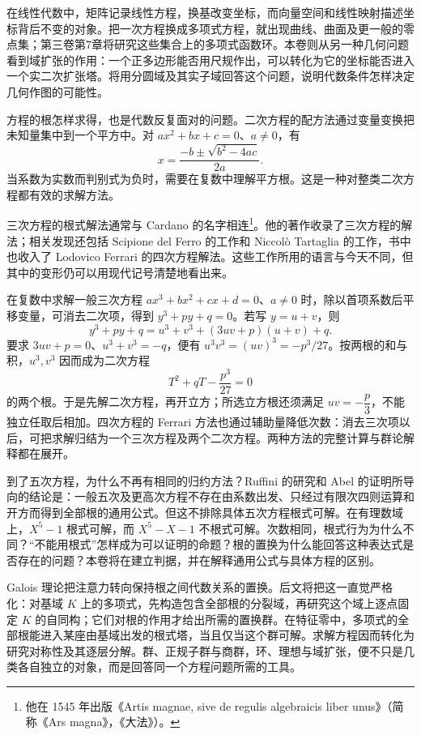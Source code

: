 在线性代数中，矩阵记录线性方程，换基改变坐标，而向量空间和线性映射描述坐标背后不变的对象。把一次方程换成多项式方程，就出现曲线、曲面及更一般的零点集；第三卷第7章将研究这些集合上的多项式函数环。本卷则从另一种几何问题看到域扩张的作用：一个正多边形能否用尺规作出，可以转化为它的坐标能否进入一个实二次扩张塔。将用分圆域及其实子域回答这个问题，说明代数条件怎样决定几何作图的可能性。

\ProseParagraphBreak
方程的根怎样求得，也是代数反复面对的问题。二次方程的配方法通过变量变换把未知量集中到一个平方中。对 \(ax^2+bx+c=0\)、\(a\ne0\)，有
\[
	x=\frac{-b\pm\sqrt{b^2-4ac}}{2a}.
\]
当系数为实数而判别式为负时，需要在复数中理解平方根。这是一种对整类二次方程都有效的求解方法。

\ProseParagraphBreak
三次方程的根式解法通常与 Cardano 的名字相连\footnote{他在 1545 年出版《Artis magnae, sive de regulis algebraicis liber unus》（简称《Ars magna》，《大法》）\cite{Cardano1545}。}。他的著作收录了三次方程的解法；相关发现还包括 Scipione del Ferro 的工作和 Niccolò Tartaglia 的工作，书中也收入了 Lodovico Ferrari 的四次方程解法。这些工作所用的语言与今天不同，但其中的变形仍可以用现代记号清楚地看出来。

\ProseParagraphBreak
在复数中求解一般三次方程 \(ax^3+bx^2+cx+d=0\)、\(a\ne0\) 时，除以首项系数后平移变量，可消去二次项，得到 \(y^3+py+q=0\)。若写 \(y=u+v\)，则
\[
	y^3+py+q=u^3+v^3+(3uv+p)(u+v)+q.
\]
要求 \(3uv+p=0\)、\(u^3+v^3=-q\)，便有 \(u^3v^3=(uv)^3=-p^3/27\)。按两根的和与积，\(u^3,v^3\) 因而成为二次方程
\[
	T^2+qT-\frac{p^3}{27}=0
\]
的两个根。于是先解二次方程，再开立方；所选立方根还须满足 \(uv=-\dfrac p3\)，不能独立任取后相加。四次方程的 Ferrari 方法也通过辅助量降低次数：消去三次项以后，可把求解归结为一个三次方程及两个二次方程。两种方法的完整计算与群论解释都在展开。

\ProseParagraphBreak
到了五次方程，为什么不再有相同的归约方法？Ruffini 的研究和 Abel 的证明所导向的结论是：一般五次及更高次方程不存在由系数出发、只经过有限次四则运算和开方而得到全部根的通用公式。但这不排除具体五次方程根式可解。在有理数域上，\(X^5-1\) 根式可解，而 \(X^5-X-1\) 不根式可解。次数相同，根式行为为什么不同？“不能用根式”怎样成为可以证明的命题？根的置换为什么能回答这种表达式是否存在的问题？本卷将在建立判据，并在解释通用公式与具体方程的区别。

\ProseParagraphBreak
Galois 理论把注意力转向保持根之间代数关系的置换。后文将把这一直觉严格化：对基域 \(K\) 上的多项式，先构造包含全部根的分裂域，再研究这个域上逐点固定 \(K\) 的自同构；它们对根的作用才给出所需的置换群。在特征零中，多项式的全部根能进入某座由基域出发的根式塔，当且仅当这个群可解。求解方程因而转化为研究对称性及其逐层分解。群、正规子群与商群，环、理想与域扩张，便不只是几类各自独立的对象，而是回答同一个方程问题所需的工具。

